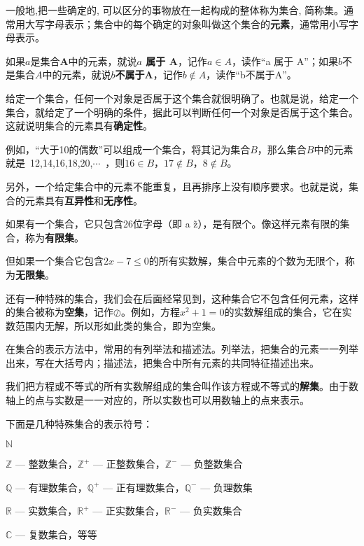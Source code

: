 \documentclass[a5paper]{article}
\begin{document}
一般地,把一些确定的, 可以区分的事物放在一起构成的整体称为集合, 简称集。通常用大写字母表示；集合中的每个确定的对象叫做这个集合的\textbf{元素}，通常用小写字母表示。

如果$a$是集合\textbf{A}中的元素，就说\textbf{$a$ 属于 A}，记作$a \in A$，读作“a 属于 A”；如果$b$不是集合$A$中的元素，就说\textbf{$b$不属于A}，记作$b\notin A$，读作“b不属于A”。

\begin{tcolorbox}[colframe = blue!20, title = {\color{red} 提示}]
    给定一个集合，任何一个对象是否属于这个集合就很明确了。也就是说，给定一个集合，就给定了一个明确的条件，据此可以判断任何一个对象是否属于这个集合。这就说明集合的元素具有\textbf{确定性}。

    例如，“大于10的偶数”可以组成一个集合，将其记为集合$B$，那么集合$B$中的元素就是~12,14,16,18,20,$\cdots$~，则$16 \in B$，$17 \notin B$，$8 \notin B$。

    另外，一个给定集合中的元素不能重复，且再排序上没有顺序要求。也就是说，集合的元素具有\textbf{互异性}和\textbf{无序性}。
\end{tcolorbox}

如果有一个集合，它只包含26位字母（即 a \~ z），是有限个。像这样元素有限的集合，称为\textbf{有限集}。

但如果一个集合它包含$2x-7 \le 0$的所有实数解，集合中元素的个数为无限个，称为\textbf{无限集}。

还有一种特殊的集合，我们会在后面经常见到，这种集合它不包含任何元素，这样的集合被称为\textbf{空集}，记作$\oslash$。例如，方程$x^2 +1=0$的实数解组成的集合，它在实数范围内无解，所以形如此类的集合，即为空集。

在集合的表示方法中，常用的有列举法和描述法。列举法，把集合的元素一一列举出来，写在大括号内；描述法，把集合中所有元素的共同特征描述出来。

我们把方程或不等式的所有实数解组成的集合叫作该方程或不等式的\textbf{解集}。由于数轴上的点与实数是一一对应的，所以实数也可以用数轴上的点来表示。

下面是几种特殊集合的表示符号：

$\mathbb{N}$ 

$\mathbb{Z}$ — 整数集合，$\mathbb{Z^+}$ — 正整数集合，$\mathbb{Z^-}$ — 负整数集合

$\mathbb{Q}$ — 有理数集合，$\mathbb{Q^+}$ — 正有理数集合，$\mathbb{Q^-}$ — 负理数集

$\mathbb{R}$ — 实数集合，$\mathbb{R^+}$ — 正实数集合，$\mathbb{R^-}$ — 负实数集合

$\mathbb{C}$ — 复数集合，等等
\end{document}
